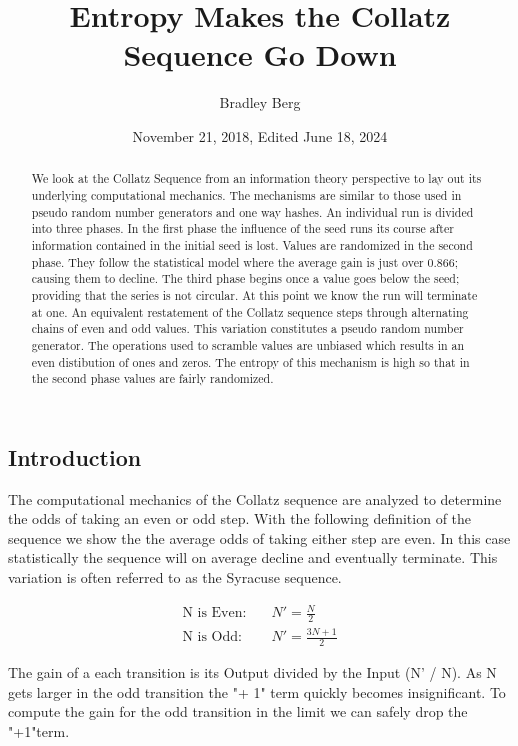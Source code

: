 \documentclass[letterpaper]{article}
\title{Entropy Makes the Collatz Sequence Go Down}
\author{Bradley Berg}
\date{November 21, 2018, Edited June 18, 2024}
\begin{document}
\maketitle

\begin{multicols}{2}

\begin{abstract}
We look at the Collatz Sequence from an information theory perspective to lay out its underlying computational mechanics. The mechanisms are similar to those used in pseudo random number generators and one way hashes.
An individual run is divided into three phases.  In the first phase the influence of the seed runs its course after information contained in the initial seed is lost.  Values are randomized in the second phase.  They follow the statistical model where the average gain is just over 0.866; causing them to decline.  The third phase begins once a value goes below the seed; providing that the series is not circular.  At this point we know the run will terminate at one.
An equivalent restatement of the Collatz sequence steps through alternating chains of even and odd values.  This variation constitutes a pseudo random number generator.  The operations used to scramble values are unbiased which results in an even distibution of ones and zeros.  The entropy of this mechanism is high so that in the second phase values are fairly randomized.
\end{abstract}

\section{Introduction}


The computational mechanics of the Collatz sequence are analyzed to determine the odds of taking an even or odd step. With the following definition of the sequence we show the the average odds of taking either step are even. In this case statistically the sequence will on average decline and eventually terminate. This variation is often referred to as the Syracuse sequence.

\begin{align*}
    \text{N is Even:} & \quad N' = \frac{N}{2} \\
    \text{N is Odd:} & \quad N' = \frac{3N + 1}{2}
\end{align*}

The gain of a each transition is its Output divided by the Input (N' / N). As N gets larger in the odd transition the "+ 1" term quickly becomes insignificant. To compute the gain for the odd transition in the limit we can safely drop the "+1"term.


\end{multicols}
\end{document}
